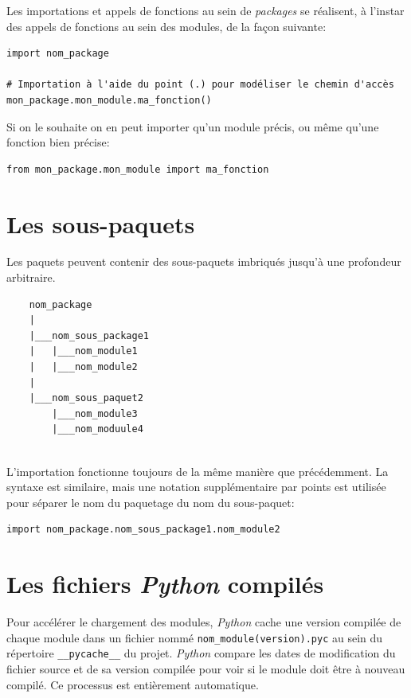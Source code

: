 \documentclass[a4paper,12pt]{book}
\begin{document}
Les importations et appels de fonctions au sein de \textit{packages} se réalisent, à l'instar des appels de fonctions au sein des modules, de la façon suivante:
\begin{lstlisting}
import nom_package

# Importation à l'aide du point (.) pour modéliser le chemin d'accès
mon_package.mon_module.ma_fonction()
\end{lstlisting}
\medskip

Si on le souhaite on en peut importer qu'un module précis, ou même qu'une fonction bien précise:
\begin{lstlisting}
from mon_package.mon_module import ma_fonction
\end{lstlisting}
\medskip

\section{Les sous-paquets}
Les paquets peuvent contenir des sous-paquets imbriqués jusqu'à une profondeur arbitraire.
\begin{verbatim}
    nom_package
    |
    |___nom_sous_package1
    |   |___nom_module1
    |   |___nom_module2
    |
    |___nom_sous_paquet2
        |___nom_module3
        |___nom_moduule4
        
\end{verbatim}
\medskip

L'importation fonctionne toujours de la même manière que précédemment. La syntaxe est similaire, mais une notation supplémentaire par points est utilisée pour séparer le nom du paquetage du nom du sous-paquet:
\begin{lstlisting}[caption=Importation module depuis un sous-paquet]
import nom_package.nom_sous_package1.nom_module2
\end{lstlisting}
\medskip

\section{Les fichiers \textit{Python} \og compilés\fg{}}
Pour accélérer le chargement des modules, \textit{Python} cache une version compilée de chaque module dans un fichier nommé \texttt{nom\_module(version).pyc} au sein du répertoire \texttt{\_\_pycache\_\_} du projet. \textit{Python} compare les dates de modification du fichier source et de sa version compilée pour voir si le module doit être à nouveau compilé. Ce processus est entièrement automatique.
\medskip
\end{document}
